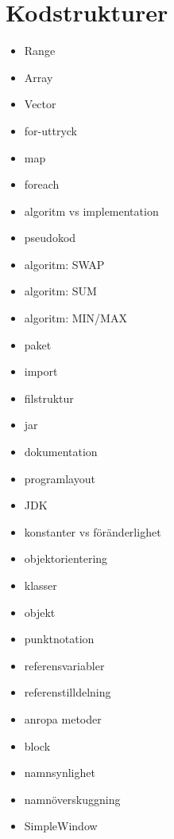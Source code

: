 \chapter{Kodstrukturer}\label{chapter:W02}
\begin{itemize}[nosep]
\item Range
\item Array
\item Vector
\item for-uttryck
\item map
\item foreach
\item algoritm vs implementation
\item pseudokod
\item algoritm: SWAP
\item algoritm: SUM
\item algoritm: MIN/MAX
\item paket
\item import
\item filstruktur
\item jar
\item dokumentation
\item programlayout
\item JDK
\item konstanter vs föränderlighet
\item objektorientering
\item klasser
\item objekt
\item punktnotation
\item referensvariabler
\item referenstilldelning
\item anropa metoder
\item block
\item namnsynlighet
\item namnöverskuggning
\item SimpleWindow
\end{itemize}